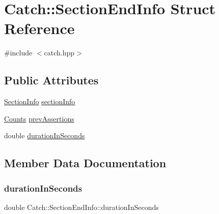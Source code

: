 \hypertarget{struct_catch_1_1_section_end_info}{}\section{Catch\+::Section\+End\+Info Struct Reference}
\label{struct_catch_1_1_section_end_info}


{\ttfamily \#include $<$catch.\+hpp$>$}

\subsection*{Public Attributes}
\begin{DoxyCompactItemize}
\item 
\mbox{\hyperlink{struct_catch_1_1_section_info}{Section\+Info}} \mbox{\hyperlink{struct_catch_1_1_section_end_info_a2d44793392cb83735d086d726822abe9}{section\+Info}}
\item 
\mbox{\hyperlink{struct_catch_1_1_counts}{Counts}} \mbox{\hyperlink{struct_catch_1_1_section_end_info_ae70b154cbc05b5dd2901d97f89303d8c}{prev\+Assertions}}
\item 
double \mbox{\hyperlink{struct_catch_1_1_section_end_info_a7c262f2dab9cff166b8eca620c47eea5}{duration\+In\+Seconds}}
\end{DoxyCompactItemize}


\subsection{Member Data Documentation}
\mbox{\label{struct_catch_1_1_section_end_info_a7c262f2dab9cff166b8eca620c47eea5}} 
\subsubsection{\texorpdfstring{durationInSeconds}{durationInSeconds}}
{\footnotesize\ttfamily double Catch\+::\+Section\+End\+Info\+::duration\+In\+Seconds}

\mbox{\label{struct_catch_1_1_section_end_info_ae70b154cbc05b5dd2901d97f89303d8c}} 
